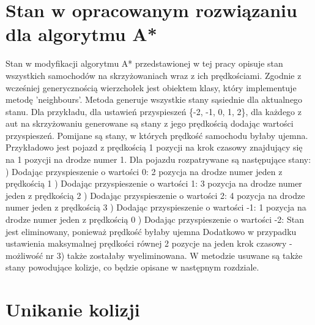 \section{Stan w opracowanym rozwiązaniu dla algorytmu A*}

Stan w modyfikacji algorytmu A* przedstawionej w tej pracy opisuje stan wszystkich samochodów na skrzyżowaniach wraz z ich prędkościami.
\newline
\newline
Zgodnie z wcześniej generycznością wierzchołek jest obiektem klasy, który implementuje metodę 'neighbours'. Metoda generuje wszystkie stany sąsiednie dla aktualnego stanu. Dla przykładu, dla ustawień przyspieszeń \{-2, -1, 0, 1, 2\}, dla każdego z aut na skrzyżowaniu generowane są stany z jego prędkością dodając wartości przyspieszeń. Pomijane są stany, w których prędkość samochodu byłaby ujemna.
\newline
\newline
Przykładowo jest pojazd z prędkością 1 pozycji na krok czasowy znajdujący się na 1 pozycji na drodze numer 1. Dla pojazdu rozpatrywane są następujące stany:
) Dodając przyspieszenie o wartości 0: 2 pozycja na drodze numer jeden z prędkością 1
) Dodając przyspieszenie o wartości 1: 3 pozycja na drodze numer jeden z prędkością 2
) Dodając przyspieszenie o wartości 2: 4 pozycja na drodze numer jeden z prędkością 3
) Dodając przyspieszenie o wartości -1: 1 pozycja na drodze numer jeden z prędkością 0
) Dodając przyspieszenie o wartości -2: Stan jest eliminowany, ponieważ prędkość byłaby ujemna
\newline
\newline
Dodatkowo w przypadku ustawienia maksymalnej prędkości równej 2 pozycje na jeden krok czasowy - możliwość nr 3) także zostałaby wyeliminowana.
\newline
\newline
W metodzie usuwane są także stany powodujące kolizje, co będzie opisane w następnym rozdziale.

\section{Unikanie kolizji}

